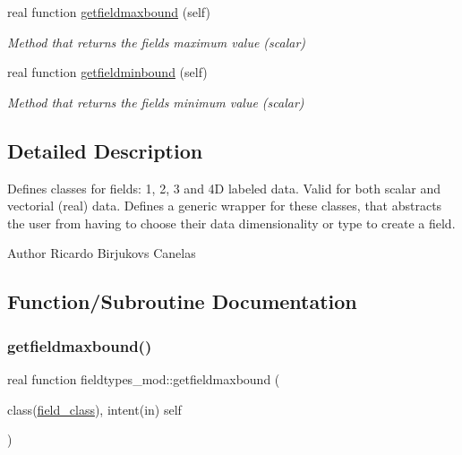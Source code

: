 \begin{DoxyCompactItemize}
real function \mbox{\hyperlink{namespacefieldtypes__mod_a2f817d22e8ca12aea1c9468c365f6460}{getfieldmaxbound}} (self)
\begin{DoxyCompactList}\small\item\em Method that returns the field\textquotesingle{}s maximum value (scalar) \end{DoxyCompactList}\item 
real function \mbox{\hyperlink{namespacefieldtypes__mod_a6811e4246f656bb9074955c5c7c107e8}{getfieldminbound}} (self)
\begin{DoxyCompactList}\small\item\em Method that returns the field\textquotesingle{}s minimum value (scalar) \end{DoxyCompactList}\end{DoxyCompactItemize}


\subsection{Detailed Description}
Defines classes for \textquotesingle{}fields\textquotesingle{}\+: 1, 2, 3 and 4D labeled data. Valid for both scalar and vectorial (real) data. Defines a generic wrapper for these classes, that abstracts the user from having to choose their data dimensionality or type to create a field. 

\begin{DoxyAuthor}{Author}
Ricardo Birjukovs Canelas 
\end{DoxyAuthor}


\subsection{Function/\+Subroutine Documentation}
\mbox{\label{namespacefieldtypes__mod_a2f817d22e8ca12aea1c9468c365f6460}} 
\subsubsection{\texorpdfstring{getfieldmaxbound()}{getfieldmaxbound()}}
{\footnotesize\ttfamily real function fieldtypes\+\_\+mod\+::getfieldmaxbound (\begin{DoxyParamCaption}\item[{class(\mbox{\hyperlink{structfieldtypes__mod_1_1field__class}{field\+\_\+class}}), intent(in)}]{self }\end{DoxyParamCaption})\hspace{0.3cm}{\ttfamily [private]}}



